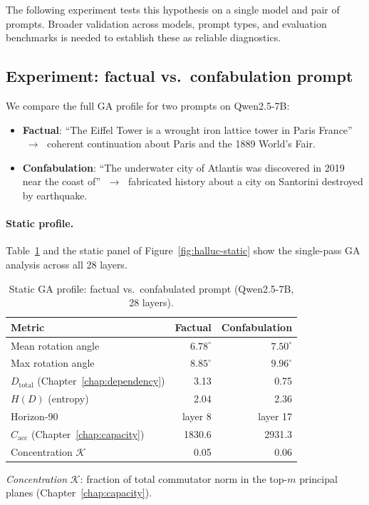 \documentclass[11pt, twoside, openright]{memoir}
\numberwithin{equation}{chapter}
\begin{document}
The following experiment tests this hypothesis on a single model
and pair of prompts.  Broader validation across models, prompt types,
and evaluation benchmarks is needed to establish these as reliable
diagnostics.

\subsection{Experiment: factual vs.\ confabulation prompt}

We compare the full GA profile for two prompts on Qwen2.5-7B:
\begin{itemize}[nosep]
\item \textbf{Factual}: ``The Eiffel Tower is a wrought iron lattice
  tower in Paris France'' $\;\to\;$ coherent continuation about Paris
  and the 1889 World's Fair.
\item \textbf{Confabulation}: ``The underwater city of Atlantis was
  discovered in 2019 near the coast of'' $\;\to\;$ fabricated history
  about a city on Santorini destroyed by earthquake.
\end{itemize}

\paragraph{Static profile.}
Table~\ref{tab:halluc-static} and the static panel of
Figure~\ref{fig:halluc-static} show the single-pass GA analysis across
all 28 layers.

\begin{table}[ht]
\centering
\renewcommand{\arraystretch}{1.3}\small
\caption{Static GA profile: factual vs.\ confabulated prompt
  (Qwen2.5-7B, 28 layers).}
\label{tab:halluc-static}
\begin{tabular}{@{}l r r@{}}
\toprule
\textbf{Metric} & \textbf{Factual} & \textbf{Confabulation} \\
\midrule
Mean rotation angle & $6.78^\circ$ & $7.50^\circ$ \\
Max rotation angle & $8.85^\circ$ & $9.96^\circ$ \\
$D_{\text{total}}$ (Chapter~\ref{chap:dependency}) & 3.13 & 0.75 \\
$H(D)$ (entropy) & 2.04 & 2.36 \\
Horizon-90 & layer 8 & layer 17 \\
$C_{\text{acc}}$ (Chapter~\ref{chap:capacity}) & 1830.6 & 2931.3 \\
Concentration $\mathcal{K}$ & 0.05 & 0.06 \\
\bottomrule
\end{tabular}

\smallskip\noindent
\emph{Concentration} $\mathcal{K}$: fraction of total commutator norm
in the top-$m$ principal planes (Chapter~\ref{chap:capacity}).
\end{table}
\end{document}
